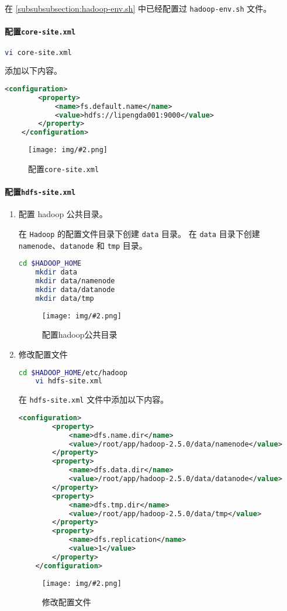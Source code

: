 \documentclass{article}
\newenvironment{enum}{
    \begin{enumerate}[label=(\arabic*), noitemsep]
}{
    \end{enumerate}
}
\newcommand{\img}[3][0.9]{%
    \begin{figure}[H]
        \centering
        \texttt{[image: img/\#2.png]}
        \caption{#3}
    \end{figure}
}
\newcommand{\subsubsubsection}[1]{\paragraph{#1}\mbox{}}
\begin{document}
在 \ref{subsubsubsection:hadoop-env.sh} 中已经配置过 \texttt{hadoop-env.sh} 文件。

\subsubsubsection{配置\texttt{core-site.xml}}

\begin{lstlisting}[language=bash]
    vi core-site.xml
\end{lstlisting}

添加以下内容。

\begin{lstlisting}[language=xml]
    <configuration>
        <property>
            <name>fs.default.name</name>
            <value>hdfs://lipengda001:9000</value>
        </property>
    </configuration>
\end{lstlisting}

\img{3.1.2.1}{配置\texttt{core-site.xml}}

\subsubsubsection{配置\texttt{hdfs-site.xml}}

\begin{enum}
    \item 配置 hadoop 公共目录。
    
    在 \texttt{Hadoop} 的配置文件目录下创建 \texttt{data} 目录。
    在 \texttt{data} 目录下创建 \texttt{namenode}、\texttt{datanode} 和 \texttt{tmp} 目录。

    \begin{lstlisting}[language=bash]
    cd $HADOOP_HOME
    mkdir data
    mkdir data/namenode
    mkdir data/datanode
    mkdir data/tmp
    \end{lstlisting}

    \img{3.1.3.1}{配置hadoop公共目录}

    \item 修改配置文件
    
    \begin{lstlisting}[language=bash]
    cd $HADOOP_HOME/etc/hadoop
    vi hdfs-site.xml
    \end{lstlisting}
    
    在 \texttt{hdfs-site.xml} 文件中添加以下内容。

    \begin{lstlisting}[language=xml]
    <configuration>
        <property>
            <name>dfs.name.dir</name>
            <value>/root/app/hadoop-2.5.0/data/namenode</value>
        </property>
        <property>
            <name>dfs.data.dir</name>
            <value>/root/app/hadoop-2.5.0/data/datanode</value>
        </property>
        <property>
            <name>dfs.tmp.dir</name>
            <value>/root/app/hadoop-2.5.0/data/tmp</value>
        </property>
        <property>
            <name>dfs.replication</name>
            <value>1</value>
        </property>
    </configuration>
    \end{lstlisting}

    \img{3.1.3.2}{修改配置文件}

\end{enum}
\end{document}
